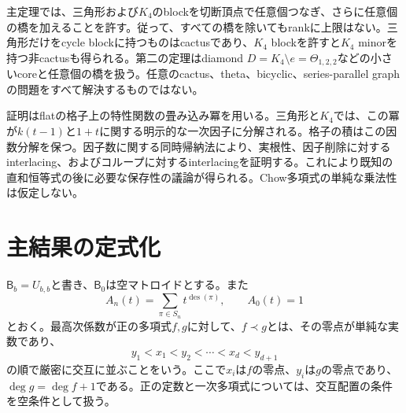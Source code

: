 \documentclass[12pt]{amsart}
\theoremstyle{definition}
\theoremstyle{remark}
\numberwithin{equation}{section}
\newcommand{\Bmat}{\mathsf{B}}
\newcommand{\des}{\operatorname{des}}
\begin{document}
主定理では、三角形および$K_4$のblockを切断頂点で任意個つなぎ、さらに任意個の橋を加えることを許す。従って、すべての橋を除いてもrankに上限はない。三角形だけをcycle blockに持つものはcactusであり、$K_4$ blockを許すと$K_4$ minorを持つ非cactusも得られる。第二の定理はdiamond $D=K_4\setminus e=\Theta_{1,2,2}$などの小さいcoreと任意個の橋を扱う。任意のcactus、theta、bicyclic、series-parallel graphの問題をすべて解決するものではない。

証明はflatの格子上の特性関数の畳み込み冪を用いる。三角形と$K_4$では、この冪が$k(t-1)$と$1+t$に関する明示的な一次因子に分解される。格子の積はこの因数分解を保つ。因子数に関する同時帰納法により、実根性、因子削除に対するinterlacing、およびコループに対するinterlacingを証明する。これにより既知の直和恒等式の後に必要な保存性の議論が得られる。Chow多項式の単純な乗法性は仮定しない。

\section{主結果の定式化}
$\Bmat_b=U_{b,b}$と書き、$\Bmat_0$は空マトロイドとする。また
\[
 A_n(t)=\sum_{\pi\in S_n}t^{\des(\pi)},\qquad A_0(t)=1
\]
とおく。最高次係数が正の多項式$f,g$に対して、$f\prec g$とは、その零点が単純な実数であり、
\[
 y_1<x_1<y_2<\cdots<x_d<y_{d+1}
\]
の順で厳密に交互に並ぶことをいう。ここで$x_i$は$f$の零点、$y_i$は$g$の零点であり、$\deg g=\deg f+1$である。正の定数と一次多項式については、交互配置の条件を空条件として扱う。
\end{document}
